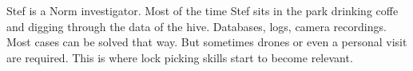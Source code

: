 \begin{npcBox}[title=Stef - a Norm investigator]
    \begin{stressSection}
    \end{stressSection}
    \begin{tabularx}{\textwidth}{ XX }
    \end{tabularx}
    
    \begin{consequences}
    \item {}
    \item {}
    \item {}
    \end{consequences}
    
    \begin{npcDescription}
    Stef is a Norm investigator. Most of the time Stef sits in the park drinking coffe and digging through the data of the hive. Databases, logs, camera recordings. Most cases can be solved that way. But sometimes drones or even a personal visit are required. This is where lock picking skills start to become relevant.
    \end{npcDescription}
    
\end{npcBox}

\newpage

